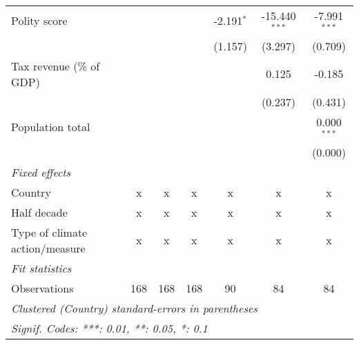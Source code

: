 \begin{tabular}{lcccccc}
   Polity score                                                &               &               &               & -2.191$^{*}$ & -15.440$^{***}$ & -7.991$^{***}$\\   
                                                               &               &               &               & (1.157)      & (3.297)         & (0.709)\\   
   Tax revenue (\% of GDP)                                     &               &               &               &              & 0.125           & -0.185\\   
                                                               &               &               &               &              & (0.237)         & (0.431)\\   
   Population total                                            &               &               &               &              &                 & 0.000$^{***}$\\   
                                                               &               &               &               &              &                 & (0.000)\\   
   \emph{Fixed effects}\\
   Country                                                     & x             & x             & x             & x            & x               & x\\  
   Half decade                                                 & x             & x             & x             & x            & x               & x\\  
   Type of climate action/measure                              & x             & x             & x             & x            & x               & x\\  
   \midrule \emph{Fit statistics}\\
   Observations                                                & 168           & 168           & 168           & 90           & 84              & 84\\  
   \midrule
   \multicolumn{7}{l}{\emph{Clustered (Country) standard-errors in parentheses}}\\
   \multicolumn{7}{l}{\emph{Signif. Codes: ***: 0.01, **: 0.05, *: 0.1}}\\
\end{tabular}
\par\endgroup


